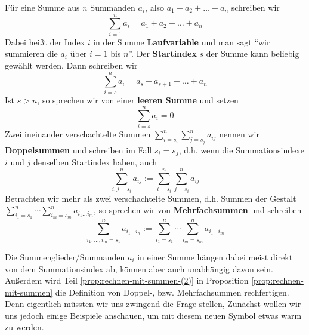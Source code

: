 \begin{definition}
    Für eine Summe aus \(n\) Summanden \(a_i\), also \(a_1 + a_2 + \dots + a_n\) schreiben wir 
    \begin{equation*}
        \sum_{i=1}^n a_i = a_1 + a_2 + \dots + a_n
    \end{equation*}
    Dabei heißt der Index \(i\) in der Summe \textbf{Laufvariable} und man sagt "`wir summieren die \(a_i\) über \(i=1\) bis \(n\)"'. Der \textbf{Startindex} \(s\) der Summe kann beliebig gewählt werden. Dann schreiben wir 
    \begin{equation*}
        \sum_{i=s}^n a_i = a_s + a_{s+1} + \dots + a_n
    \end{equation*}
    Ist \(s> n\), so sprechen wir von einer \textbf{leeren Summe} und setzen 
    \begin{equation*}
        \sum_{i=s}^n a_i = 0
    \end{equation*}
    Zwei ineinander verschachtelte Summen \(\sum_{i=s_i}^n \sum_{j=s_j}^n a_{ij}\) nennen wir \textbf{Doppelsummen} und schreiben im Fall \(s_i = s_j\), d.h. wenn die Summationsindexe \(i\) und \(j\) denselben Startindex haben, auch 
    \begin{equation*}
        \sum_{i,j=s_i}^n a_{ij} := \sum_{i=s_i}^n \sum_{j=s_i}^n a_{ij}
    \end{equation*}
    Betrachten wir mehr als zwei verschachtelte Summen, d.h. Summen der Gestalt \(\sum_{i_1=s_1}^n \cdots \sum_{i_m=s_m}^n a_{i_1\dots i_m}\), so sprechen wir von \textbf{Mehrfachsummen} und schreiben
    \begin{equation*}
        \sum_{i_1, \dots, i_m=s_1}^n a_{i_1 \dots i_n} := \sum_{i_1=s_1}^n \cdots \sum_{i_m=s_m}^n a_{i_1\dots i_m}
    \end{equation*}
\end{definition}
Die Summenglieder/Summanden \(a_i\) in einer Summe hängen dabei meist direkt von dem Summationsindex ab, können aber auch unabhängig davon sein. Außerdem wird Teil \ref{prop:rechnen-mit-summen-(2)} in Proposition \ref{prop:rechnen-mit-summen} die Definition von Doppel-, bzw. Mehrfachsummen rechfertigen. Denn eigentlich müssten wir uns zwingend die Frage stellen,   Zunächst wollen wir uns jedoch einige Beispiele anschauen, um mit diesem neuen Symbol etwas warm zu werden. 

